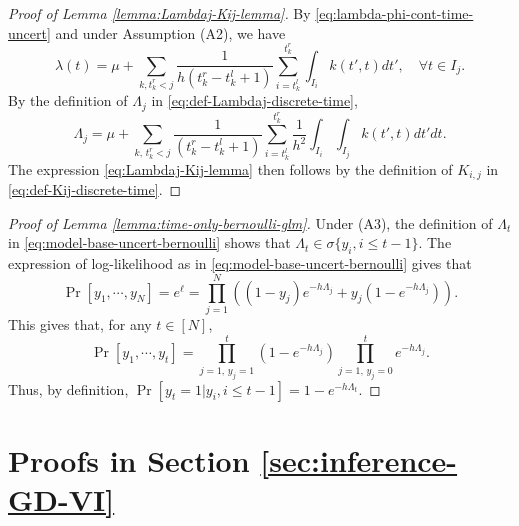 \documentclass[11pt]{article}
\theoremstyle{remark}
\theoremstyle{plain}
\begin{document}
%
\begin{proof}[Proof of Lemma \ref{lemma:Lambdaj-Kij-lemma}]
By \eqref{eq:lambda-phi-cont-time-uncert} and under Assumption (A2), we have
\begin{equation*}
    \lambda(t) = \mu + \sum_{k, t_k^r < j } \frac{1}{ h (t_k^r - t_k^l+1)} \sum_{i=t_k^l}^{t_k^r} \int_{I_{i}} k( t', t) dt',
    \quad \forall t \in I_j.
\end{equation*} 
By the definition of $\Lambda_j$ in \eqref{eq:def-Lambdaj-discrete-time}, 
\begin{equation*}
    \Lambda_j 
    = \mu + \sum_{k, \, t_k^r < j } \frac{1}{ (t_k^r - t_k^l+1)}  \sum_{i=t_k^l}^{t_k^r}  \frac{1}{ h^2 }\int_{I_{i}} \int_{I_j} k( t', t) dt' dt.
\end{equation*}
The expression \eqref{eq:Lambdaj-Kij-lemma} then follows by the definition of $K_{i,j}$ in \eqref{eq:def-Kij-discrete-time}.
\end{proof}





%
\begin{proof}[Proof of Lemma \ref{lemma:time-only-bernoulli-glm}]
Under (A3),  the definition of $\Lambda_t$ in  \eqref{eq:model-base-uncert-bernoulli} shows that $\Lambda_t \in \sigma\{ y_i, i\le t-1 \}$.
The expression of log-likelihood as in \eqref{eq:model-base-uncert-bernoulli} gives that 
\[
\Pr[ y_1, \cdots, y_N] =  e^{\ell} 
=  \prod_{j=1}^N  
\left( 
(1-y_j) e^{- h  \Lambda_j } 
+ y_j   ( 1 - e^{ - h  \Lambda_j} ) 
\right).
\]
This gives that, for any $t \in [ N]$,
\[
\Pr[ y_1, \cdots, y_t]
 =   \prod_{j=1, \, y_j = 1}^t  ( 1 - e^{ - h  \Lambda_j} ) 
   \prod_{j=1, \, y_j = 0}^t e^{- h  \Lambda_j }. 
\]
Thus, by definition, $\Pr [y_t = 1 |  y_i, i\le t-1 ] = 1 - e^{ - h  \Lambda_t}$. 
\end{proof}




\section{Proofs in Section \ref{sec:inference-GD-VI}}\label{app:proofs-sec:4}
\end{document}
